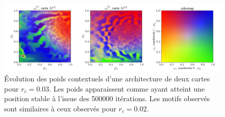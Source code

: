 \documentclass[../main]{subfiles}
\begin{document}


\begin{figure}
	\includegraphics[width=\textwidth]{weights_contexte-0-048_rc003.png}
	\caption{\'Evolution des poids contextuels d'une architecture de deux cartes pour $r_c =0.03$. Les poids apparaissent comme ayant atteint une position stable à l'issue des 500000 itérations.
	Les motifs observés sont similaires à ceux observés pour $r_c = 0.02$. \label{fig:rc_003}}
\end{figure}
\end{document}
